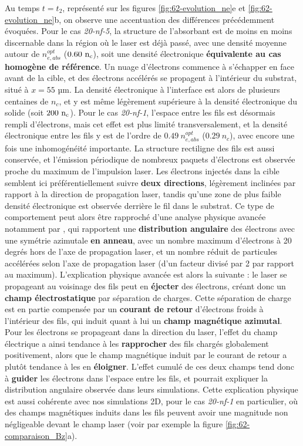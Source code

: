 \begin{refsection}
Au temps $t=t_2$, représenté sur les figures \ref{fig:62-evolution_ne}e et \ref{fig:62-evolution_ne}b, on observe une accentuation des différences précédemment évoquées. Pour le cas \textit{20-nf-5}, la structure de l'absorbant est de moins en moins discernable dans la région où le laser est déjà passé, avec une densité moyenne autour de $n_{e,abs}^{opt}$ ($0.60 ~ \rm n_c$), soit une densité électronique \textbf{équivalente au cas homogène de référence}. Un nuage d'électrons commence à s'échapper en face avant de la cible, et des électrons accélérés se propagent à l'intérieur du substrat, situé à $x=55$ µm. La densité électronique à l'interface est alors de plusieurs centaines de $n_c$, et y est même légèrement supérieure à la densité électronique du solide (soit $200 ~ \rm n_c$). Pour le cas \textit{20-nf-1}, l'espace entre les fils est désormais rempli d'électrons, mais cet effet est plus limité transversalement, et la densité électronique entre les fils y est de l'ordre de $0.49 ~ n_{e,abs}^{opt}$ ($0.29 ~ n_c$), avec encore une fois une inhomogénéité importante. La structure rectiligne des fils est aussi conservée, et l'émission périodique de nombreux paquets d'électrons est observée proche du maximum de l'impulsion laser. Les électrons injectés dans la cible semblent ici préférentiellement suivre \textbf{deux directions}, légèrement inclinées par rapport à la direction de propagation laser, tandis qu'une zone de plus faible densité électronique est observée derrière le fil dans le substrat. Ce type de comportement peut alors être rapproché d'une analyse physique avancée notamment par \cite{fedeli_2018c}, qui rapportent une \textbf{distribution angulaire} des électrons avec une symétrie azimutale \textbf{en anneau}, avec un nombre maximum d'électrons à 20 degrés hors de l'axe de propagation laser, et un nombre réduit de particules accélérées selon l'axe de propagation laser (d'un facteur divisé par 2 par rapport au maximum). L'explication physique avancée est alors la suivante : le laser se propageant au voisinage des fils peut en \textbf{éjecter} des électrons, créant donc un \textbf{champ électrostatique} par séparation de charges. Cette séparation de charge est en partie compensée par un \textbf{courant de retour} d'électrons froids à l'intérieur des fils, qui induit quant à lui un \textbf{champ magnétique azimutal}. Pour les électrons se propageant dans la direction du laser, l'effet du champ électrique a ainsi tendance à les \textbf{rapprocher} des fils chargés globalement positivement, alors que le champ magnétique induit par le courant de retour a plutôt tendance à les en \textbf{éloigner}. L'effet cumulé de ces deux champs tend donc à \textbf{guider} les électrons dans l'espace entre les fils, et pourrait expliquer la distribution angulaire observée dans leurs simulations. Cette explication physique est aussi cohérente avec nos simulations 2D, pour le cas \textit{20-nf-1} en particulier, où des champs magnétiques induits dans les fils peuvent avoir une magnitude non négligeable devant le champ laser (voir par exemple la figure \ref{fig:62-comparaison_Bz}a).


\end{refsection}
